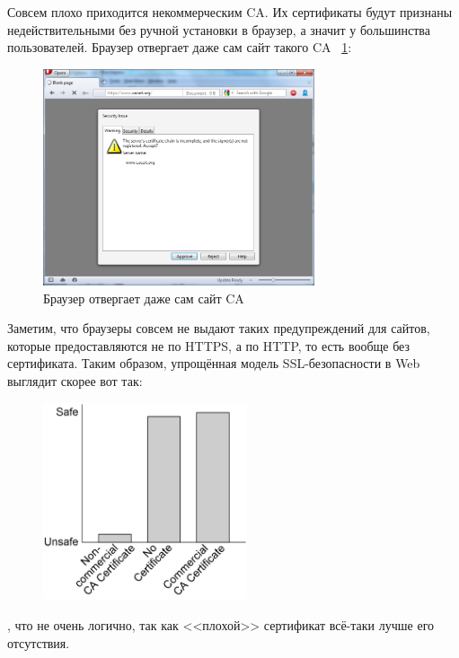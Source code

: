\documentclass[10pt, a5paper]{article}
\begin{document}
Совсем плохо приходится некоммерческим CA. Их сертификаты будут
признаны недействительными без ручной установки в браузер, а значит
у большинства пользователей. Браузер отвергает даже сам сайт такого
CA ~\ref{Hlebnikov4}:

\begin{center}

\begin{figure}[h!]
  \centering
  \includegraphics[width=8cm]{Hlebnikov4.png}
  \caption{Браузер отвергает даже сам сайт CA}
  \label{Hlebnikov4}
\end{figure}

\end{center}

Заметим, что браузеры совсем не выдают таких предупреждений для
сайтов, которые предоставляются не по HTTPS, а по HTTP, то есть
вообще без сертификата. Таким образом, упрощённая модель
SSL-безопасности в Web выглядит скорее вот так:

\begin{center}

\begin{figure}[h!]
  \centering
  \includegraphics[width=6cm]{Hlebnikov5.png}
  
  \label{Hlebnikov5}
\end{figure}

\end{center}
, что не очень логично, так как <<плохой>> сертификат всё-таки лучше его
отсутствия.
\end{document}

